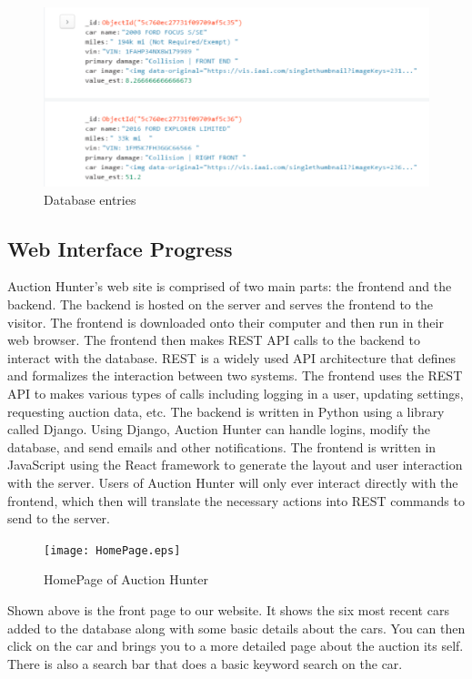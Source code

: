 \documentclass[onecolumn, draftclsnofoot,10pt, compsoc]{IEEEtran}
\begin{document}
\begin{figure}[H]
\centering
\includegraphics[scale=0.85]{db}
\caption{Database entries}
\label{fig:mongoDB}
\end{figure}

\subsection{Web Interface Progress}
Auction Hunter's web site is comprised of two main parts: the frontend and the backend. The backend is hosted on the server and serves the frontend to the visitor. The frontend is downloaded onto their computer and then run in their web browser. The frontend then makes REST API calls to the backend to interact with the database. REST is a widely used API architecture that defines and formalizes the interaction between two systems. 
The frontend uses the REST API to makes various types of calls including logging in a user, updating settings, requesting auction data, etc. The backend is written in Python using a library called Django. Using Django, Auction Hunter can handle logins, modify the database, and send emails and other notifications. The frontend is written in JavaScript using the React framework to generate the layout and user interaction with the server. Users of Auction Hunter will only ever interact directly with the frontend, which then will translate the necessary actions into REST commands to send to the server. 

\begin{figure}[H]
\centering
\texttt{[image: HomePage.eps]}
\caption{HomePage of Auction Hunter}
\label{fig:homepage}
\end{figure}

Shown above is the front page to our website. It shows the six most recent cars added to the database along with some basic details about the cars. You can then click on the car and brings you to a more detailed page about the auction its self. There is also a search bar that does a basic keyword search on the car. 
\end{document}
